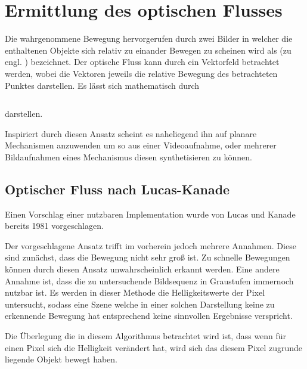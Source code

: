 
\chapter{Ermittlung des optischen Flusses}

Die wahrgenommene Bewegung hervorgerufen durch zwei Bilder in welcher die enthaltenen Objekte sich relativ zu einander Bewegen zu scheinen wird als (zu engl. ) bezeichnet. %
Der optische Fluss kann durch ein Vektorfeld betrachtet werden, wobei die Vektoren jeweils die relative Bewegung des betrachteten Punktes darstellen.
Es lässt sich mathematisch durch

\begin{equation}
\label{eq:optical_flow}
\end{equation}

darstellen.


Inspiriert durch diesen Ansatz scheint es naheliegend ihn auf planare Mechanismen anzuwenden um so aus einer Videoaufnahme, oder mehrerer Bildaufnahmen eines Mechanismus diesen synthetisieren zu können.


\section{Optischer Fluss nach Lucas-Kanade}

Einen Vorschlag einer nutzbaren Implementation wurde von Lucas und Kanade bereits 1981 vorgeschlagen. %

Der vorgeschlagene Ansatz trifft im vorherein jedoch mehrere Annahmen.
Diese sind zunächst, dass die Bewegung nicht sehr groß ist.
Zu schnelle Bewegungen können durch diesen Ansatz unwahrscheinlich erkannt werden.
Eine andere Annahme ist, dass die zu untersuchende Bildsequenz in Graustufen immernoch nutzbar ist.
Es werden in dieser Methode die Helligkeitswerte der Pixel untersucht, sodass eine Szene welche in einer solchen Darstellung keine zu erkennende Bewegung hat entsprechend keine sinnvollen Ergebnisse verspricht.

Die Überlegung die in diesem Algorithmus betrachtet wird ist, dass wenn für einen Pixel sich die Helligkeit verändert hat, wird sich das diesem Pixel zugrunde liegende Objekt bewegt haben.

